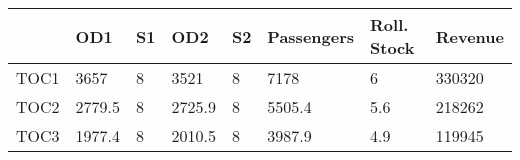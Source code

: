 \begin{tabular}{llllllll}
& OD1 & S1 & OD2 & S2 & Passengers & Roll. Stock & Revenue \\ 
\hline 
TOC1 & 3657 & 8 & 3521 & 8 & 7178 & 6 & 330320 \\ 
TOC2 & 2779.5 & 8 & 2725.9 & 8 & 5505.4 & 5.6 & 218262 \\ 
TOC3 & 1977.4 & 8 & 2010.5 & 8 & 3987.9 & 4.9 & 119945 \\ 
\hline 
\end{tabular}